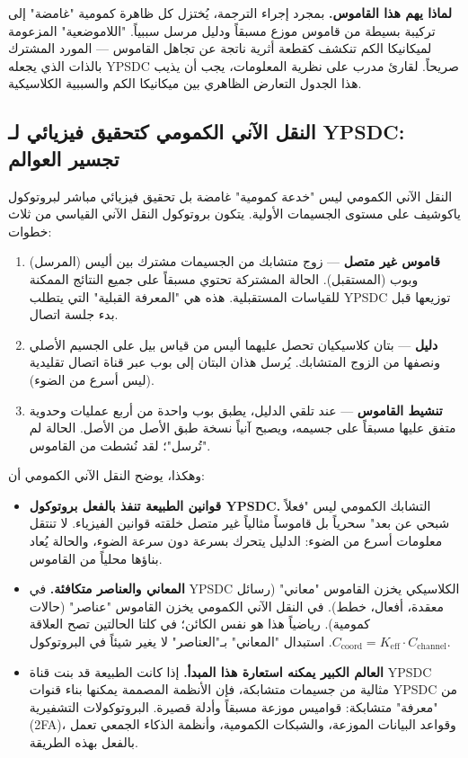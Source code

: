 \documentclass[12pt,a4paper]{article}
\theoremstyle{remark}
\begin{document}
	\noindent
	\textbf{لماذا يهم هذا القاموس.} بمجرد إجراء الترجمة، يُختزل كل ظاهرة كمومية "غامضة" إلى تركيبة بسيطة من قاموس موزع مسبقاً ودليل مرسل سببياً. "اللاموضعية" المزعومة لميكانيكا الكم تنكشف كقطعة أثرية ناتجة عن تجاهل القاموس — المورد المشترك بالذات الذي يجعله YPSDC صريحاً. لقارئ مدرب على نظرية المعلومات، يجب أن يذيب هذا الجدول التعارض الظاهري بين ميكانيكا الكم والسببية الكلاسيكية.
	
	\subsection{النقل الآني الكمومي كتحقيق فيزيائي لـ YPSDC: تجسير العوالم}
	
	النقل الآني الكمومي ليس "خدعة كمومية" غامضة بل تحقيق فيزيائي مباشر لبروتوكول ياكوشيف على مستوى الجسيمات الأولية. يتكون بروتوكول النقل الآني القياسي من ثلاث خطوات:
	
	\begin{enumerate}
		\item \textbf{قاموس غير متصل} — زوج متشابك من الجسيمات مشترك بين أليس (المرسل) وبوب (المستقبل). الحالة المشتركة تحتوي مسبقاً على جميع النتائج الممكنة للقياسات المستقبلية. هذه هي "المعرفة القبلية" التي يتطلب YPSDC توزيعها قبل بدء جلسة اتصال.
		\item \textbf{دليل} — بتان كلاسيكيان تحصل عليهما أليس من قياس بيل على الجسيم الأصلي ونصفها من الزوج المتشابك. يُرسل هذان البتان إلى بوب عبر قناة اتصال تقليدية (ليس أسرع من الضوء).
		\item \textbf{تنشيط القاموس} — عند تلقي الدليل، يطبق بوب واحدة من أربع عمليات وحدوية متفق عليها مسبقاً على جسيمه، ويصبح آنياً نسخة طبق الأصل من الأصل. الحالة لم "تُرسل"؛ لقد نُشطت من القاموس.
	\end{enumerate}
	
	وهكذا، يوضح النقل الآني الكمومي أن:
	
	\begin{itemize}
		\item \textbf{قوانين الطبيعة تنفذ بالفعل بروتوكول YPSDC.} التشابك الكمومي ليس "فعلاً شبحي عن بعد" سحرياً بل قاموساً مثالياً غير متصل خلقته قوانين الفيزياء. لا تنتقل معلومات أسرع من الضوء: الدليل يتحرك بسرعة دون سرعة الضوء، والحالة يُعاد بناؤها محلياً من القاموس.
		\item \textbf{المعاني والعناصر متكافئة.} في YPSDC الكلاسيكي يخزن القاموس "معاني" (رسائل معقدة، أفعال، خطط). في النقل الآني الكمومي يخزن القاموس "عناصر" (حالات كمومية). رياضياً هذا هو نفس الكائن؛ في كلتا الحالتين تصح العلاقة \( C_{\mathrm{coord}} = K_{\mathrm{eff}} \cdot C_{\mathrm{channel}} \). استبدال "المعاني" بـ"العناصر" لا يغير شيئاً في البروتوكول.
		\item \textbf{العالم الكبير يمكنه استعارة هذا المبدأ.} إذا كانت الطبيعة قد بنت قناة YPSDC مثالية من جسيمات متشابكة، فإن الأنظمة المصممة يمكنها بناء قنوات YPSDC من "معرفة" متشابكة: قواميس موزعة مسبقاً وأدلة قصيرة. البروتوكولات التشفيرية (2FA)، وقواعد البيانات الموزعة، والشبكات الكمومية، وأنظمة الذكاء الجمعي تعمل بالفعل بهذه الطريقة.
	\end{itemize}
	
\end{document}
